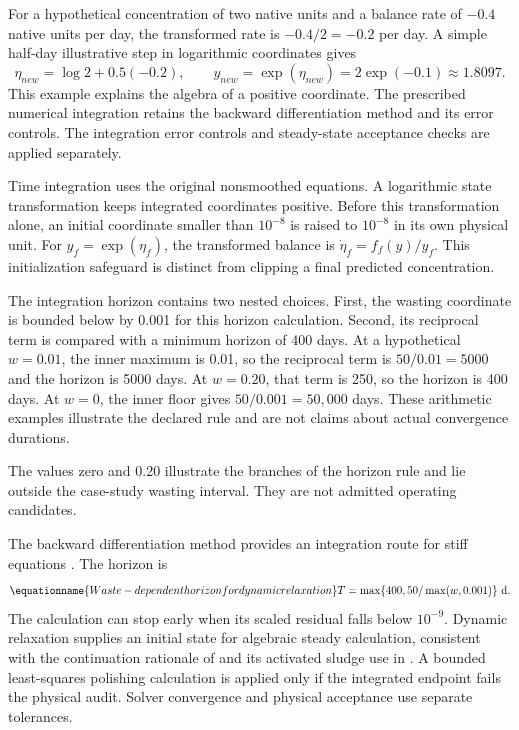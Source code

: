 For a hypothetical concentration of two native units and a balance rate of $-0.4$ native units per day, the transformed rate is $-0.4/2=-0.2$ per day. A simple half-day illustrative step in logarithmic coordinates gives
\[
\eta_{new}=\log2+0.5(-0.2),\qquad
y_{new}=\exp(\eta_{new})=2\exp(-0.1)\approx1.8097.
\]
This example explains the algebra of a positive coordinate. The prescribed numerical integration retains the backward differentiation method and its error controls. The integration error controls and steady-state acceptance checks are applied separately.

Time integration uses the original nonsmoothed equations. A logarithmic state transformation keeps integrated coordinates positive. Before this transformation alone, an initial coordinate smaller than $10^{-8}$ is raised to $10^{-8}$ in its own physical unit. For $y_f=\exp(\eta_f)$, the transformed balance is $\dot\eta_f=f_f(y)/y_f$. This initialization safeguard is distinct from clipping a final predicted concentration.

The integration horizon contains two nested choices. First, the wasting coordinate is bounded below by 0.001 for this horizon calculation. Second, its reciprocal term is compared with a minimum horizon of 400 days. At a hypothetical $w=0.01$, the inner maximum is 0.01, so the reciprocal term is $50/0.01=5000$ and the horizon is 5000 days. At $w=0.20$, that term is 250, so the horizon is 400 days. At $w=0$, the inner floor gives $50/0.001=50{,}000$ days. These arithmetic examples illustrate the declared rule and are not claims about actual convergence durations.

The values zero and 0.20 illustrate the branches of the horizon rule and lie outside the case-study wasting interval. They are not admitted operating candidates.

The backward differentiation method provides an integration route for stiff equations \citep{CurtissHirschfelder1952}. The horizon is
\begin{equation}
\equationname{Waste-dependent horizon for dynamic relaxation}
T=\max\{400,50/\max(w,0.001)\}\ \mathrm{d}.
\label{eq:plant_integration_horizon}
\end{equation}
The calculation can stop early when its scaled residual falls below $10^{-9}$. Dynamic relaxation supplies an initial state for algebraic steady calculation, consistent with the continuation rationale of \citet{KelleyKeyes1998} and its activated sludge use in \citet{Selerio2026}. A bounded least-squares polishing calculation is applied only if the integrated endpoint fails the physical audit. Solver convergence and physical acceptance use separate tolerances.

